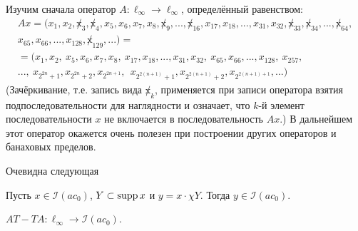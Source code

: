 Изучим сначала оператор $A:\ell_\infty\to\ell_\infty$,
определённый равенством:
\begin{multline}
	\label{eq:oper_A_throws_out_2power_blocks}
	Ax = (x_1, x_2, \not x_3, \not x_4, x_5, x_6, x_7, x_8, \not x_9, ..., \not x_{16}, x_{17}, x_{18}, ..., x_{31}, x_{32}, \not x_{33}, \not x_{34}, ..., \not x_{64},
	\\
	x_{65}, x_{66}, ..., x_{128}, \not x_{129}, ...)=
	\\=
	(x_1, x_2, \ x_5, x_6, x_7, x_8, \ x_{17}, x_{18}, ..., x_{31}, x_{32}, \ x_{65}, x_{66}, ..., x_{128}, \ x_{257},
	\\
	..., \ x_{2^{2n} +1}, x_{2^{2n} +2},  x_{2^{2n+1}}, \ \ x_{2^{2(n+1)} +1},  x_{2^{2(n+1)} +2},  x_{2^{2(n+1)+1}}, ...)
\end{multline}
(Зачёркивание, т.е. запись вида $\not x_k$,
применяется при записи оператора взятия подпоследовательности для наглядности и означает,
что $k$-й элемент последовательности $x$ не включается в последовательность $Ax$.)
В дальнейшем этот оператор окажется очень полезен при построении других операторов и банаховых пределов.

Очевидна следующая

\begin{lemma}
	\label{lem:supp_I_ac0}
	Пусть $x\in \mathcal I(ac_0)$, $Y \subset \operatorname{supp} x$ и $y = x \cdot \chi Y$.
	Тогда $y \in \mathcal I(ac_0)$.
\end{lemma}


\begin{lemma}
	\label{lem:AT-TA}
	$AT - TA: \ell_\infty \to \mathcal{I}(ac_0)$.
\end{lemma}

